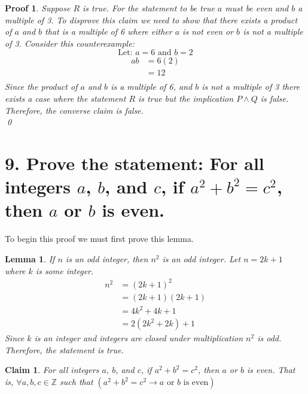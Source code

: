 \documentclass[11pt]{article}
\newtheorem*{claim}{Claim}
\newtheorem{lemma}{Lemma}
\newtheorem*{myproof}{Proof}
\begin{document}
\begin{myproof}
Suppose $R$ is true. For the statement to be true $a$ must be even and $b$ a multiple of 3. To disprove this claim we need to show that there exists a product of $a$ and $b$ that is a multiple of 6 where either $a$ is not even or $b$ is not a multiple of 3. Consider this counterexample:
$$\text{Let: } a = 6 \text{ and } b = 2 $$
\begin{align*}
       ab &= 6(2) \\
       &= 12 \\
\end{align*}
Since the product of $a$ and $b$ is a multiple of 6, and $b$ is not a multiple of 3 there exists a case where the statement $R$ is true but the implication $P \wedge Q$ is false. Therefore, the converse claim is false. \\
\qed
\end{myproof}

\newpage

\section*{9. Prove the statement: For all integers $a$, $b$, and $c$, if $a^2+b^2=c^2$, then $a$ or $b$ is even.}
To begin this proof we must first prove this lemma.
\begin{lemma}
    If $n$ is an odd integer, then $n^2$ is an odd integer. Let $n = 2k+1$ where $k$ is some integer.
    \begin{align*}
        n^2 &= (2k+1)^2 \\
        &= (2k+1)(2k+1) \\ 
        &= 4k^2+4k+1 \\
        &= 2(2k^2+2k)+1
    \end{align*}
    Since $k$ is an integer and integers are closed under multiplication $n^2$ is odd. Therefore, the statement is true.
\end{lemma}
\begin{claim}
    For all integers $a$, $b$, and $c$, if $a^2+b^2=c^2$, then $a$ or $b$ is even. That is, $\forall a,b,c \in \mathbb{Z}$ such that $(a^2+b^2=c^2 \rightarrow a \text{ or } b \text{ is even})$
\end{claim}
\end{document}
